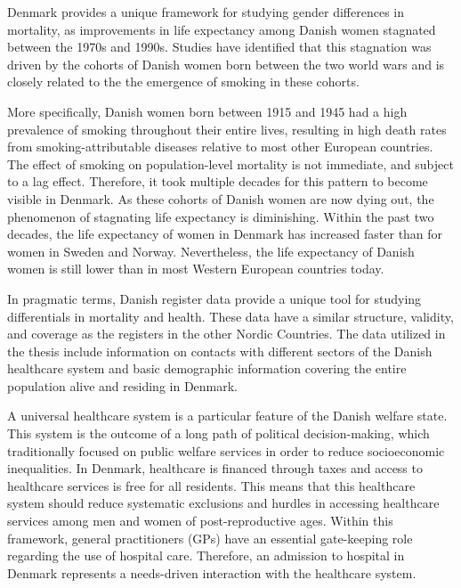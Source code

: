 Denmark provides a unique framework for studying gender differences 
in mortality, as improvements in life expectancy among Danish women 
stagnated between the 1970s and 1990s.\citep{jacobsen2002,bronnum2005health,
jeune2008trends,aburto2018potential} Studies have identified that this 
stagnation was driven by the cohorts of Danish women born between the 
two world wars and is closely related to the  the emergence of smoking 
in these cohorts.\citep{jacobsen2004women,lindahl2016did}

More specifically, Danish women born between 1915 and 1945 had a 
high prevalence of smoking throughout their entire lives, resulting 
in high death rates from smoking-attributable diseases relative to 
most other European countries.\citep{jacobsen2006} The effect of smoking 
on population-level mortality is not immediate, and subject to a lag 
effect.\citep{lopez1994descriptive} Therefore, it took multiple decades 
for this pattern to become visible in Denmark. As these cohorts of Danish 
women are now dying out, the phenomenon of stagnating life expectancy is 
diminishing.\citep{jacobsen2016} Within the past two decades, the life 
expectancy of women in Denmark has increased faster than for women in 
Sweden and Norway.\citep{jacobsen2016} Nevertheless, the life expectancy 
of Danish women is still lower than in most Western European countries 
today.\citep{human2005university,human2005university} 

In pragmatic terms, Danish register data provide a unique tool for 
studying differentials in mortality and health.\citep{frank2000entire,
schmidt2014,thygesen2014entire} These data have a similar structure, 
validity, and coverage as the registers in the other Nordic Countries.\citep{olsen2010high,
thygesen2014entire,maret2017nordic} The data utilized in the thesis 
include information on contacts with different sectors of the Danish 
healthcare system and basic demographic information covering the 
entire population alive and residing in Denmark.

A universal healthcare system is a particular feature of the Danish 
welfare state. This system is the outcome of a long path of political 
decision-making, which traditionally focused on public welfare 
services in order to reduce socioeconomic inequalities.\citep{vrangbaek2005health}
In Denmark, healthcare is financed through taxes and access to healthcare 
services is free for all residents.\citep{juul2012denmark,pedersen2012general} 
This means that this healthcare system should reduce systematic exclusions 
and hurdles in accessing healthcare services among men and women of 
post-reproductive ages. Within this framework, general practitioners 
(GPs) have an essential gate-keeping role regarding the use of hospital 
care.\citep{sahl2011danish,juul2012denmark,pedersen2012general} Therefore, 
an admission to hospital in Denmark represents a needs-driven interaction 
with the healthcare system. \\


